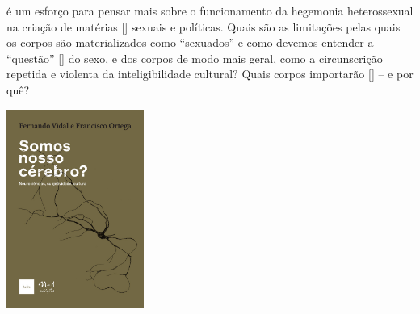 \medskip

 é um esforço para pensar mais sobre o funcionamento da hegemonia heterossexual na criação de matérias [{}] sexuais e políticas. Quais são as limitações pelas quais os corpos são materializados como “sexuados” e como devemos entender a “questão” [{}] do sexo, e dos corpos de modo mais geral, como a circunscrição repetida e violenta da inteligibilidade cultural? Quais corpos importarão [{}] – e por quê?

\vfill

\hspace*{-.4cm}\begin{minipage}[c]{1\linewidth}
\small{
{}}
\end{minipage}

\pagebreak

\hspace{.5cm}

\begin{center}
\hspace*{-2.5cm}
\hspace*{2cm}\includegraphics[width=45mm]{./imgs/cerebro.jpeg}
\end{center}

\hspace*{-7cm}\hrulefill\hspace*{-7cm}


